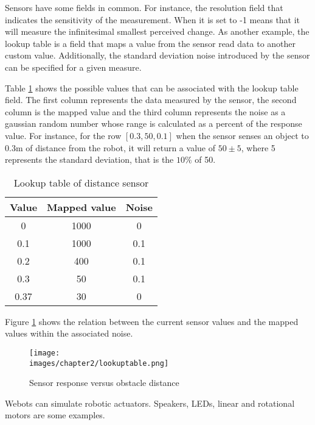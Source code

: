 Sensors have some fields in common. For instance, the resolution field that indicates the sensitivity of the measurement. When it is set to -1 means that it will measure the infinitesimal smallest perceived change. As another example, the lookup table is a field that maps a value from the sensor read data to another custom value. Additionally, the standard deviation noise introduced by the sensor can be specified for a given measure. 

Table \ref{tab:ch-2:lookup} shows the possible values that can be associated with the lookup table field. The first column represents the data measured by the sensor, the second column is the mapped value and the third column represents the noise as a gaussian random number whose range is calculated as a percent of the response value\cite{cyberbotics}. For instance, for the row $[0.3, 50, 0.1]$ when the sensor senses an object to 0.3m of distance from the robot, it will return a value of $50 \pm 5$, where 5 represents the standard deviation, that is the $10\%$ of 50.
\begin{table}[h!]
\centering
 \begin{tabular}{c c c} 
 \hline
 Value & Mapped value & Noise \\ [0.5ex] 
 \hline\hline
 0 & 1000 & 0 \\ 
 \hline
0.1 & 1000 & 0.1 \\ 
 \hline
 0.2 & 400 & 0.1 \\ 
 \hline
 0.3 & 50 & 0.1 \\ 
 \hline
 0.37 & 30 & 0 \\ 
 \hline
\end{tabular}
\caption{Lookup table of distance sensor}
\label{tab:ch-2:lookup}
\end{table}

Figure \ref{fig:ch-2:lookup} shows the relation between the current sensor values and the mapped values within the associated noise.

\begin{figure}[h!]
  \centering
  \texttt{[image: \\images/chapter2/lookuptable.png]}
  \caption{Sensor response versus obstacle distance}
  \label{fig:ch-2:lookup}
\end{figure}


Webots can simulate robotic actuators. Speakers, LEDs, linear and rotational motors are some examples. 


















